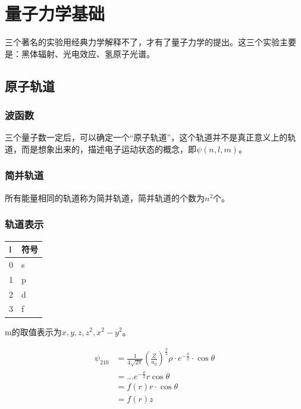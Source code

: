\chapter{量子力学基础}

三个著名的实验用经典力学解释不了，才有了量子力学的提出。这三个实验主要是：黑体辐射、光电效应、氢原子光谱。







\section{原子轨道}

\subsection{波函数}

三个量子数一定后，可以确定一个“原子轨道”，这个轨道并不是真正意义上的轨道，而是想象出来的，描述电子运动状态的概念，即$\psi(n, l, m)$。


\subsection{简并轨道}


所有能量相同的轨道称为简并轨道，简并轨道的个数为$n^2$个。


\subsection{轨道表示}

\begin{table}[H]
    \centering
    \begin{tabular}{ll}
        \toprule
        l & 符号 \\ 
        \midrule
        0 & s \\
        1 & p \\ 
        2 & d \\
        3 & f \\
        \bottomrule
    \end{tabular}

\end{table}
m的取值表示为$x, y, z, z^2, x^2 - y^2$。

\begin{align*}
    \psi_{210} &= \frac{1}{4 \sqrt{2 \pi}} \left( \frac{Z}{a_0} \right)^{\frac{3}{2}} \rho \cdot e^{-\frac{\rho}{2}} \cdot \cos \theta \\ 
    &= \dots e^{-\frac{\rho}{2}} r \cos \theta \\
    &= f(r) r \cdot \cos \theta \\
    &= f(r) z
\end{align*}


